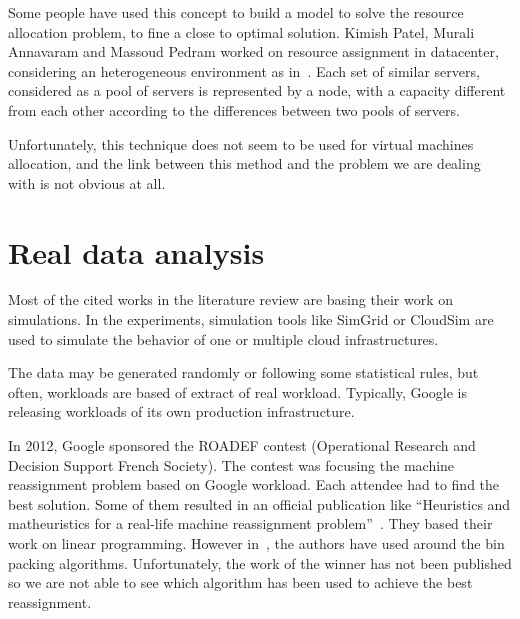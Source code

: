 Some people have used this concept to build a model to solve the resource
allocation problem, to fine a close to optimal solution. Kimish Patel, Murali
Annavaram and Massoud Pedram worked on resource assignment in
datacenter\cite{allocationNetworkflow}, considering an heterogeneous
environment as in~\cite{allocationHeterogeneous}. Each set of similar servers,
considered as a pool of servers is represented by a node, with a capacity
different from each other according to the differences between two pools of
servers.

Unfortunately, this technique does not seem to be used for virtual machines
allocation, and the link between this method and the problem we are dealing
with is not obvious at all.

\section{Real data analysis}

Most of the cited works in the literature review are basing their work on
simulations. In the experiments, simulation tools like
SimGrid\cite{websiteSimgrid} or CloudSim\cite{websiteCloudsim} are used to
simulate the behavior of one or multiple cloud infrastructures.

The data may be generated randomly or following some statistical rules, but
often, workloads are based of extract of real workload. Typically, Google is
releasing workloads of its own production infrastructure. 

In 2012, Google sponsored the ROADEF contest (Operational Research and Decision
Support French Society)\cite{websiteRoadef}. The contest was focusing the machine
reassignment problem based on Google workload. Each attendee had to find the
best solution. Some of them resulted in an official publication
like “Heuristics and matheuristics for a real-life machine reassignment
problem”~\cite*{roadefIp}.  They based their work on linear programming.
However in~\cite{roadefBp1, roadefBp2}, the authors have used
around the bin packing algorithms. Unfortunately, the work of the winner has
not been published so we are not able to see which algorithm has been used to
achieve the best reassignment.
